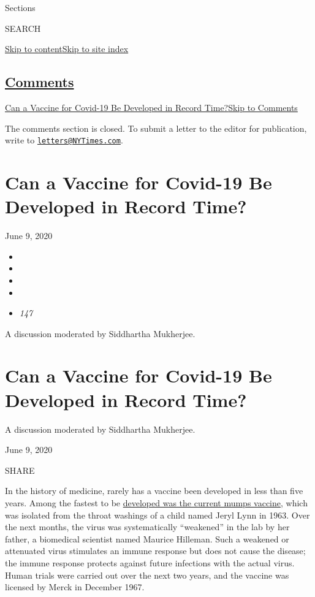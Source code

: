 Sections

SEARCH

\protect\hyperlink{site-content}{Skip to
content}\protect\hyperlink{site-index}{Skip to site index}

\hypertarget{comments}{%
\subsection{\texorpdfstring{\protect\hyperlink{commentsContainer}{Comments}}{Comments}}\label{comments}}

\href{}{Can a Vaccine for Covid-19 Be Developed in Record
Time?}\href{}{Skip to Comments}

The comments section is closed. To submit a letter to the editor for
publication, write to
\href{mailto:letters@NYTimes.com}{\nolinkurl{letters@NYTimes.com}}.

\hypertarget{can-a-vaccine-for-covid-19-be-developed-in-record-time}{%
\section{Can a Vaccine for Covid-19 Be Developed in Record
Time?}\label{can-a-vaccine-for-covid-19-be-developed-in-record-time}}

June 9, 2020

\begin{itemize}
\item
\item
\item
\item
\item
  \emph{147}
\end{itemize}

A discussion moderated by Siddhartha Mukherjee.

\hypertarget{can-a-vaccine-for-covid-19-be-developed-in-record-time-1}{%
\section{Can a Vaccine for Covid-19 Be Developed in Record
Time?}\label{can-a-vaccine-for-covid-19-be-developed-in-record-time-1}}

A discussion moderated by Siddhartha Mukherjee.

June 9, 2020

SHARE

In the history of medicine, rarely has a vaccine been developed in less
than five years. Among the fastest to be
\href{https://www.nytimes3xbfgragh.onion/2013/05/07/health/maurice-hilleman-mmr-vaccines-forgotten-hero.html}{developed
was the current mumps vaccine}, which was isolated from the throat
washings of a child named Jeryl Lynn in 1963. Over the next months, the
virus was systematically ``weakened'' in the lab by her father, a
biomedical scientist named Maurice Hilleman. Such a weakened or
attenuated virus stimulates an immune response but does not cause the
disease; the immune response protects against future infections with the
actual virus. Human trials were carried out over the next two years, and
the vaccine was licensed by Merck in December 1967.

